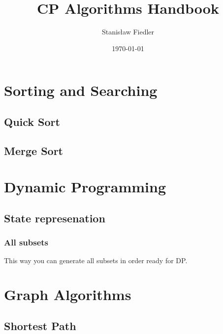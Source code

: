 \documentclass[13pt]{article}
\title{ \vspace{-1cm}
	CP Algorithms Handbook}
\author{Stanisław Fiedler}
\date{\today}
\begin{document}
\maketitle
\tableofcontents
\pagebreak


\section{Sorting and Searching}

\subsection{Quick Sort}\label{sub:quick_sort} %

\subsection{Merge Sort}\label{sub:merge_sort} %




\section{Dynamic Programming}

\subsection{State represenation}\label{sub:state_represenation} %

\subsubsection{All subsets}\label{ssub:all_subsets} %
This way you can generate all subsets in order ready for DP.



\pagebreak

\section{Graph Algorithms}

\subsection{Shortest Path}\label{sub:shortest_path} %
\end{document}

